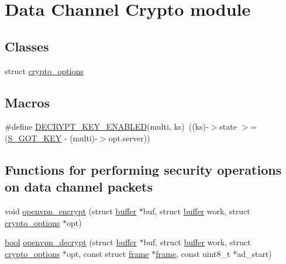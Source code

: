 \hypertarget{group__data__crypto}{}\section{Data Channel Crypto module}
\label{group__data__crypto}
\subsection*{Classes}
\begin{DoxyCompactItemize}
\item 
struct \hyperlink{structcrypto__options}{crypto\+\_\+options}
\end{DoxyCompactItemize}
\subsection*{Macros}
\begin{DoxyCompactItemize}
\item 
\#define \hyperlink{group__data__crypto_ga531ce54a40ba4525b7ef859ef7425a38}{D\+E\+C\+R\+Y\+P\+T\+\_\+\+K\+E\+Y\+\_\+\+E\+N\+A\+B\+L\+E\+D}(multi,  ks)~((ks)-\/$>$state $>$= (\hyperlink{group__control__processor_ga66bd0f7cdbc8450a4690c519de7d75bc}{S\+\_\+\+G\+O\+T\+\_\+\+K\+E\+Y} -\/ (multi)-\/$>$opt.\+server))
\end{DoxyCompactItemize}
\subsection*{Functions for performing security operations on data channel packets}
\begin{DoxyCompactItemize}
\item 
void \hyperlink{group__data__crypto_ga2756bad88224b98719d4e8f08cb11ef9}{openvpn\+\_\+encrypt} (struct \hyperlink{structbuffer}{buffer} $\ast$buf, struct \hyperlink{structbuffer}{buffer} work, struct \hyperlink{structcrypto__options}{crypto\+\_\+options} $\ast$opt)
\item 
\hyperlink{automatic_8c_abb452686968e48b67397da5f97445f5b}{bool} \hyperlink{group__data__crypto_gae91d99446478fcf3327672eb78ef0bf8}{openvpn\+\_\+decrypt} (struct \hyperlink{structbuffer}{buffer} $\ast$buf, struct \hyperlink{structbuffer}{buffer} work, struct \hyperlink{structcrypto__options}{crypto\+\_\+options} $\ast$opt, const struct \hyperlink{structframe}{frame} $\ast$\hyperlink{structframe}{frame}, const uint8\+\_\+t $\ast$ad\+\_\+start)
\end{DoxyCompactItemize}

